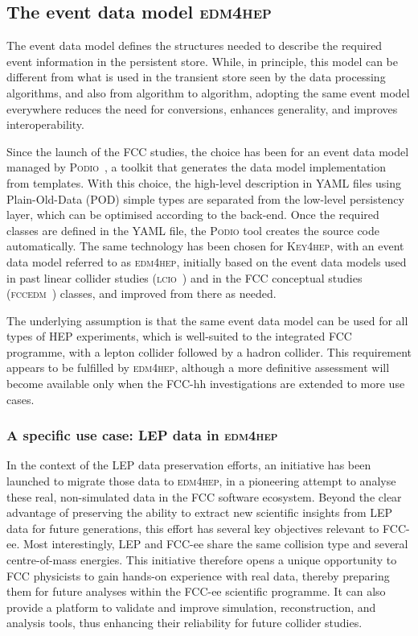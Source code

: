 \subsection{The event data model \textsc{edm4hep}}
\label{sec:edm4hep}

The event data model defines the structures needed to describe the required event information in the persistent store. 
While, in principle, this model can be different from what is used in the transient store seen by the data processing algorithms, 
and also from algorithm to algorithm, 
adopting the same event model everywhere reduces the need for conversions, enhances generality, and improves interoperability.

Since the launch of the FCC studies, the choice has been for an event data model managed by \textsc{Podio}~\cite{Podio}, 
a toolkit that generates the data model implementation from templates. 
With this choice, the high-level description in YAML files using Plain-Old-Data (POD) simple types 
are separated from the low-level persistency layer, which can be optimised according to the back-end. 
Once the required classes are defined in the YAML file, the \textsc{Podio} tool creates the source code automatically. 
The same technology has been chosen for \textsc{Key4hep}, with an event data model referred to as \textsc{edm4hep}, 
initially based on the event data models used in past linear collider studies (\textsc{lcio}~\cite{lcio}) 
and in the FCC conceptual studies (\textsc{fccedm}~\cite{fcc-ee-cdr}) classes, and improved from there as needed. 

The underlying assumption is that the same event data model can be used for all types of HEP experiments, 
which is well-suited to the integrated FCC programme, with a lepton collider followed by a hadron collider.
This requirement appears to be fulfilled by \textsc{edm4hep}, 
although a more definitive assessment will become available only when the FCC-hh investigations are extended to more use cases. 

\subsubsection{A specific use case: LEP data in \textsc{edm4hep}}
\label{sec:lepedm4hep}

In the context of the LEP data preservation efforts, an initiative has been launched to migrate those data to \textsc{edm4hep}, 
in a pioneering attempt to analyse these real, non-simulated data in the FCC software ecosystem. 
Beyond the clear advantage of preserving the ability to extract new scientific insights from LEP data for future generations, 
this effort has several key objectives relevant to FCC-ee. 
Most interestingly, LEP and FCC-ee share the same collision type and several centre-of-mass energies. 
This initiative therefore opens a unique opportunity to FCC physicists to gain hands-on experience with real data, 
thereby preparing them for future analyses within the FCC-ee scientific programme. 
It can also provide a platform to validate and improve simulation, reconstruction, and analysis tools, 
thus enhancing their reliability for future collider studies.

